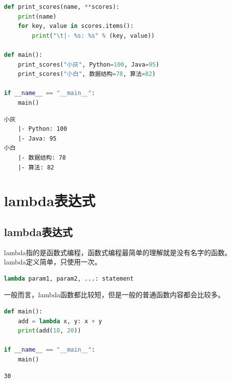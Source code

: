 \begin{lstlisting}[language=Python]
def print_scores(name, **scores):
	print(name)
	for key, value in scores.items():
		print("\t|- %s: %s" % (key, value))

def main():
	print_scores("小灰", Python=100, Java=95)
	print_scores("小白", 数据结构=78, 算法=82)

if __name__ == "__main__":
	main()
\end{lstlisting}

\begin{tcolorbox}
	\begin{verbatim}
小灰
    |- Python: 100
    |- Java: 95
小白
    |- 数据结构: 78
    |- 算法: 82
\end{verbatim}
\end{tcolorbox}

\newpage

\section{lambda表达式}

\subsection{lambda表达式}

lambda指的是函数式编程，函数式编程最简单的理解就是没有名字的函数。lambda定义简单，只使用一次。

\vspace{-0.5cm}

\begin{lstlisting}[language=Python]
lambda param1, param2, ...: statement
\end{lstlisting}

一般而言，lambda函数都比较短，但是一般的普通函数内容都会比较多。\\


\begin{lstlisting}[language=Python]
def main():
	add = lambda x, y: x + y
	print(add(10, 20))

if __name__ == "__main__":
	main()
\end{lstlisting}

\begin{tcolorbox}
	\begin{verbatim}
30
\end{verbatim}
\end{tcolorbox}

